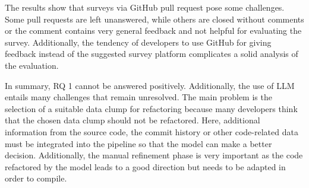 The results show that surveys via GitHub pull request pose some challenges. Some pull requests are left unanswered, while others are closed without comments or the comment contains very general feedback and not helpful for evaluating the survey. Additionally, the tendency of developers to use GitHub for giving feedback  instead of the suggested survey platform complicates a solid analysis of the evaluation.

In summary, RQ 1 cannot be answered positively. Additionally, the use of \ac{LLM} entails many challenges that remain unresolved. The main problem is the selection of a suitable data clump for refactoring because many developers think that the chosen data clump should not be refactored. Here, additional information from the source code, the commit history or other code-related data must be integrated into the pipeline so that the model can make a better decision. Additionally, the manual refinement phase is very important as the code refactored by the model leads to a good direction but needs to be adapted in order to compile. 